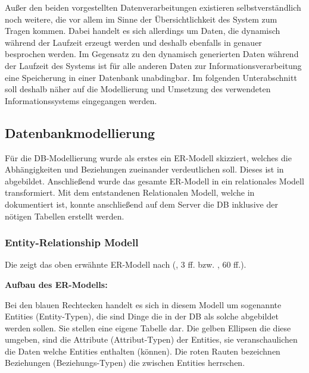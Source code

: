 Außer den beiden vorgestellten Datenverarbeitungen existieren selbstverständlich noch weitere, die vor allem im Sinne der Übersichtlichkeit des System  zum Tragen kommen. 
Dabei handelt es sich allerdings um Daten, die dynamisch während der Laufzeit erzeugt werden und deshalb ebenfalls in  genauer besprochen werden.
Im Gegensatz zu den dynamisch generierten Daten während der Laufzeit des Systems ist für alle anderen Daten zur Informationsverarbeitung eine Speicherung in einer Datenbank unabdingbar.
Im folgenden Unterabschnitt soll deshalb näher auf die Modellierung und Umsetzung des verwendeten Informationssystems eingegangen werden.

\subsection{Datenbankmodellierung}\label{subsec:Datenbankmodellierung}

Für die \ac{DB}-Modellierung wurde als erstes ein \ac{ER-Modell} skizziert, welches die Abhängigkeiten und Beziehungen zueinander verdeutlichen soll. Dieses ist in  abgebildet. Anschließend wurde das gesamte \ac{ER-Modell} in ein relationales Modell transformiert.
Mit dem entstandenen Relationalen Modell, welche in  dokumentiert ist, konnte anschließend auf dem Server die \ac{DB} inklusive der nötigen Tabellen erstellt werden.

\subsubsection{Entity-Relationship Modell}\label{subsec:ERModell}

Die  zeigt das oben erwähnte \ac{ER-Modell} nach  (\cite{ChenPe}, 3 ff. bzw. \cite{VossenG-DDD}, 60 ff.).

\textbf{Aufbau des \ac{ER-Modell}s:}

Bei den blauen Rechtecken handelt es sich in diesem Modell um sogenannte Entities (Entity-Typen), die sind Dinge die in der \ac{DB} als solche abgebildet werden sollen. Sie stellen eine eigene Tabelle dar. Die gelben Ellipsen die diese umgeben, sind die Attribute (Attribut-Typen) der Entities, sie veranschaulichen die Daten welche Entities enthalten (können).
Die roten Rauten bezeichnen Beziehungen (Beziehungs-Typen) die zwischen Entities herrschen.

